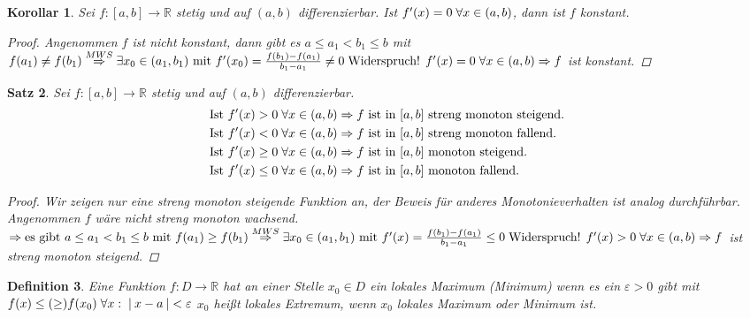 \documentclass[a4paper,titlepage,oneside]{article}
\def\R{\ensuremath{\mathbb{R}} }
\renewcommand{\epsilon}{\ensuremath{\varepsilon} }
\def\WSP{\text{Widerspruch! }}
\def\sp{\hspace{0,1cm}}
\newcommand{\abs}[1]{\ensuremath{\left|\:#1\:\right|}}
\theoremstyle{thmstyle}
\newtheorem{satz}{Satz}[section]
\newtheorem{korr}[satz]{Korollar}
\newtheorem{defi}[satz]{Definition}
\theoremstyle{subthmstyle}
\begin{document}
\begin{korr}
Sei $f : [a,b] \to \R $ stetig und auf $(a,b)$ differenzierbar. Ist $f'(x) = 0 \sp \forall x \in (a,b)$, dann ist $f$ konstant.
\begin{proof}
Angenommen $f$ ist nicht konstant, dann gibt es $a \le a_1 < b_1 \le b$ mit $f(a_1) \ne f(b_1) \overset{MWS}{\Rightarrow} \exists x_0 \in (a_1, b_1) \text{ mit } f'(x_0) = \frac{f(b_1) - f(a_1)}{b_1 - a_1} \ne 0 \sp \WSP f'(x) = 0 \sp \forall x \in (a,b) \Rightarrow f$ ist konstant.
\end{proof}
\end{korr}

\begin{satz}
Sei $f : [a,b] \to \R $ stetig und auf $(a,b)$ differenzierbar.
\begin{align*}\text{Ist } f'(x) > 0 \sp \forall x \in (a,b) &\Rightarrow f \text{ ist in } [a,b] \text{ streng monoton steigend.}\\
\text{Ist } f'(x) < 0 \sp \forall x \in (a,b) &\Rightarrow f \text{ ist in } [a,b] \text{ streng monoton fallend.}\\
\text{Ist } f'(x) \ge 0 \sp \forall x \in (a,b) &\Rightarrow f \text{ ist in } [a,b] \text{ monoton steigend.}\\
\text{Ist } f'(x) \le 0 \sp \forall x \in (a,b) &\Rightarrow f \text{ ist in } [a,b] \text{ monoton fallend.}
\end{align*}
\begin{proof}
Wir zeigen nur eine streng monoton steigende Funktion an, der Beweis für anderes Monotonieverhalten ist analog durchführbar.\\
Angenommen $f$ wäre nicht streng monoton wachsend. $\Rightarrow \text{es gibt } a \le a_1 < b_1 \le b \text{ mit } f(a_1) \ge f(b_1) \overset{MWS}{\Rightarrow} \exists x_0 \in (a_1, b_1) \text{ mit } f'(x) = \frac{f(b_1) - f(a_1)}{b_1 - a_1} \le 0 \sp \WSP f'(x) > 0 \sp \forall x \in (a,b) \Rightarrow f$ ist streng monoton steigend.
\end{proof}
\end{satz}

\begin{defi}
Eine Funktion $f : D \to \R$ hat an einer Stelle $x_0 \in D$ ein lokales Maximum (Minimum) wenn es ein $\epsilon > 0 $ gibt mit $f(x) \le (\ge) f(x_0) \sp \forall x : \sp \abs{x - a} < \epsilon$
$x_0$ heißt lokales Extremum, wenn $x_0$ lokales Maximum oder Minimum ist.
\end{defi}
\end{document}
